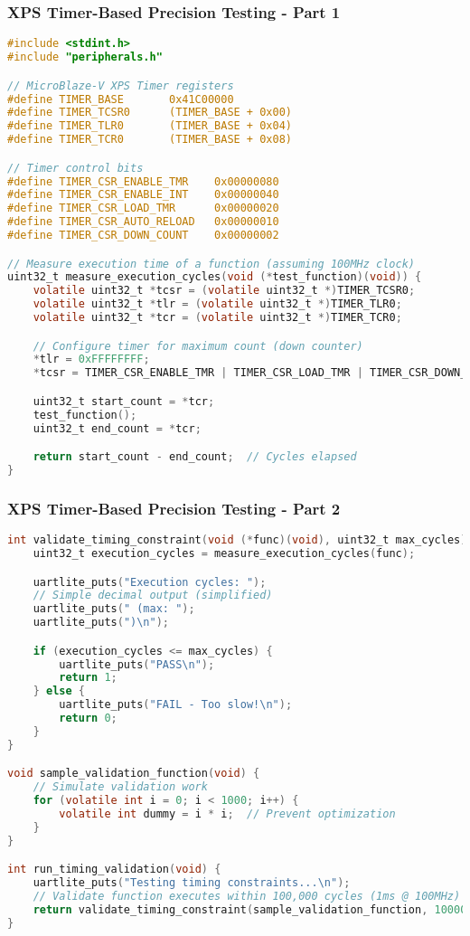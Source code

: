 \documentclass{beamer}
\begin{document}
\begin{frame}[fragile]
\frametitle{XPS Timer-Based Precision Testing - Part 1}
\begin{lstlisting}[language=C, basicstyle=\fontsize{5}{2}\selectfont\ttfamily, backgroundcolor={}]
#include <stdint.h>
#include "peripherals.h"

// MicroBlaze-V XPS Timer registers
#define TIMER_BASE       0x41C00000
#define TIMER_TCSR0      (TIMER_BASE + 0x00)
#define TIMER_TLR0       (TIMER_BASE + 0x04)
#define TIMER_TCR0       (TIMER_BASE + 0x08)

// Timer control bits
#define TIMER_CSR_ENABLE_TMR    0x00000080
#define TIMER_CSR_ENABLE_INT    0x00000040
#define TIMER_CSR_LOAD_TMR      0x00000020
#define TIMER_CSR_AUTO_RELOAD   0x00000010
#define TIMER_CSR_DOWN_COUNT    0x00000002

// Measure execution time of a function (assuming 100MHz clock)
uint32_t measure_execution_cycles(void (*test_function)(void)) {
    volatile uint32_t *tcsr = (volatile uint32_t *)TIMER_TCSR0;
    volatile uint32_t *tlr = (volatile uint32_t *)TIMER_TLR0;
    volatile uint32_t *tcr = (volatile uint32_t *)TIMER_TCR0;

    // Configure timer for maximum count (down counter)
    *tlr = 0xFFFFFFFF;
    *tcsr = TIMER_CSR_ENABLE_TMR | TIMER_CSR_LOAD_TMR | TIMER_CSR_DOWN_COUNT;

    uint32_t start_count = *tcr;
    test_function();
    uint32_t end_count = *tcr;

    return start_count - end_count;  // Cycles elapsed
}
\end{lstlisting}
\end{frame}

\begin{frame}[fragile]
\frametitle{XPS Timer-Based Precision Testing - Part 2}
\begin{lstlisting}[language=C, basicstyle=\fontsize{5}{2}\selectfont\ttfamily, backgroundcolor={}]
int validate_timing_constraint(void (*func)(void), uint32_t max_cycles) {
    uint32_t execution_cycles = measure_execution_cycles(func);

    uartlite_puts("Execution cycles: ");
    // Simple decimal output (simplified)
    uartlite_puts(" (max: ");
    uartlite_puts(")\n");

    if (execution_cycles <= max_cycles) {
        uartlite_puts("PASS\n");
        return 1;
    } else {
        uartlite_puts("FAIL - Too slow!\n");
        return 0;
    }
}

void sample_validation_function(void) {
    // Simulate validation work
    for (volatile int i = 0; i < 1000; i++) {
        volatile int dummy = i * i;  // Prevent optimization
    }
}

int run_timing_validation(void) {
    uartlite_puts("Testing timing constraints...\n");
    // Validate function executes within 100,000 cycles (1ms @ 100MHz)
    return validate_timing_constraint(sample_validation_function, 100000);
}
\end{lstlisting}
\end{frame}
\end{document}
